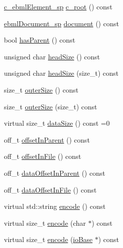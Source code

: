 \begin{DoxyCompactItemize}
\item 
\mbox{\hyperlink{namespaceebml_a2deef4e8071531b32e3533f1bf978917}{c\+\_\+ebml\+Element\+\_\+sp}} \mbox{\hyperlink{classebml_1_1ebmlElement_a3dddd3edbb6c96b8765107fccad5826b}{c\+\_\+root}} () const
\item 
\mbox{\hyperlink{namespaceebml_a66018942b568da5041136a945148b450}{ebml\+Document\+\_\+sp}} \mbox{\hyperlink{classebml_1_1ebmlElement_a1ee44e2978cd9e23c98cd9c05dd8fa35}{document}} () const
\item 
bool \mbox{\hyperlink{classebml_1_1ebmlElement_a9a784c3c424216ecd4b320e2cfc713b2}{has\+Parent}} () const
\item 
unsigned char \mbox{\hyperlink{classebml_1_1ebmlElement_a9305dc06339d900f81bd986653457e28}{head\+Size}} () const
\item 
unsigned char \mbox{\hyperlink{classebml_1_1ebmlElement_a87e926e72a5c1280b674573256dc08b1}{head\+Size}} (size\+\_\+t) const
\item 
size\+\_\+t \mbox{\hyperlink{classebml_1_1ebmlElement_aa6e265beb13dae353d75cdacc77748e1}{outer\+Size}} () const
\item 
size\+\_\+t \mbox{\hyperlink{classebml_1_1ebmlElement_ac482f4483500dbe1b9042350ee81c1be}{outer\+Size}} (size\+\_\+t) const
\item 
virtual size\+\_\+t \mbox{\hyperlink{classebml_1_1ebmlElement_a47ed4167d9c69104e02b6dbad0cd1fef}{data\+Size}} () const =0
\item 
off\+\_\+t \mbox{\hyperlink{classebml_1_1ebmlElement_a10df5e4a342a2ec9682de0faec4f470c}{offset\+In\+Parent}} () const
\item 
off\+\_\+t \mbox{\hyperlink{classebml_1_1ebmlElement_ab9f3e77ee8dcab574942f5402619fbb9}{offset\+In\+File}} () const
\item 
off\+\_\+t \mbox{\hyperlink{classebml_1_1ebmlElement_ab6d5b99a9986587b7d1a806d6613faf3}{data\+Offset\+In\+Parent}} () const
\item 
off\+\_\+t \mbox{\hyperlink{classebml_1_1ebmlElement_a9b495834bf82f45ceaa81df19b7d643f}{data\+Offset\+In\+File}} () const
\item 
virtual std\+::string \mbox{\hyperlink{classebml_1_1ebmlElement_aaeddd5ffc1da2f3d4f2a9c9ec1dbed4d}{encode}} () const
\item 
virtual size\+\_\+t \mbox{\hyperlink{classebml_1_1ebmlElement_a5aeddfac34c2c839873146be6c634aed}{encode}} (char $\ast$) const
\item 
virtual size\+\_\+t \mbox{\hyperlink{classebml_1_1ebmlElement_ad493e4103807b8d4434c0667c148dcea}{encode}} (\mbox{\hyperlink{classebml_1_1ioBase}{io\+Base}} $\ast$) const

\end{DoxyCompactItemize}
